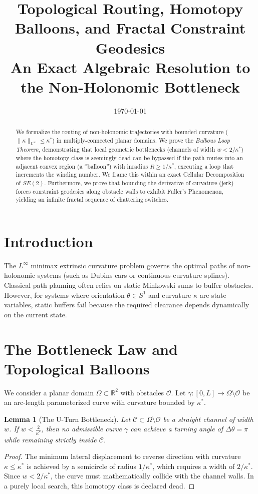 \documentclass[12pt, a4paper]{article}
\title{Topological Routing, Homotopy Balloons, and Fractal Constraint Geodesics\\
\large An Exact Algebraic Resolution to the Non-Holonomic Bottleneck}
\date{\today}
\newtheorem{lemma}[theorem]{Lemma}
\begin{document}
\maketitle

\begin{abstract}
We formalize the routing of non-holonomic trajectories with bounded curvature ($\|\kappa\|_{L^\infty} \le \kappa^*$) in multiply-connected planar domains. We prove the \emph{Bulbous Loop Theorem}, demonstrating that local geometric bottlenecks (channels of width $w < 2/\kappa^*$) where the homotopy class is seemingly dead can be bypassed if the path routes into an adjacent convex region (a ``balloon'') with inradius $R \ge 1/\kappa^*$, executing a loop that increments the winding number. We frame this within an exact Cellular Decomposition of $SE(2)$. Furthermore, we prove that bounding the derivative of curvature (jerk) forces constraint geodesics along obstacle walls to exhibit Fuller's Phenomenon, yielding an infinite fractal sequence of chattering switches.
\end{abstract}

\section{Introduction}

The $L^\infty$ minimax extrinsic curvature problem governs the optimal paths of non-holonomic systems (such as Dubins cars or continuous-curvature splines). Classical path planning often relies on static Minkowski sums to buffer obstacles. However, for systems where orientation $\theta \in S^1$ and curvature $\kappa$ are state variables, static buffers fail because the required clearance depends dynamically on the current state.

\section{The Bottleneck Law and Topological Balloons}

We consider a planar domain $\Omega \subset \mathbb{R}^2$ with obstacles $\mathcal{O}$. Let $\gamma: [0, L] \to \Omega \setminus \mathcal{O}$ be an arc-length parameterized curve with curvature bounded by $\kappa^*$.

\begin{lemma}[The U-Turn Bottleneck]
Let $\mathcal{C} \subset \Omega \setminus \mathcal{O}$ be a straight channel of width $w$. If $w < \frac{2}{\kappa^*}$, then no admissible curve $\gamma$ can achieve a turning angle of $\Delta \theta = \pi$ while remaining strictly inside $\mathcal{C}$.
\end{lemma}
\begin{proof}
The minimum lateral displacement to reverse direction with curvature $\kappa \le \kappa^*$ is achieved by a semicircle of radius $1/\kappa^*$, which requires a width of $2/\kappa^*$. Since $w < 2/\kappa^*$, the curve must mathematically collide with the channel walls. In a purely local search, this homotopy class is declared dead.
\end{proof}
\end{document}
